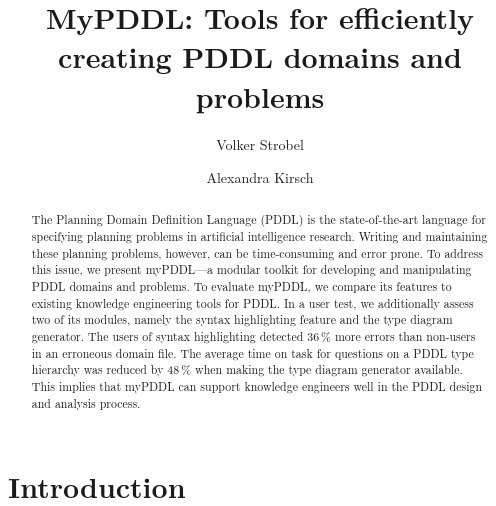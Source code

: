 \documentclass[runningheads]{llncs}
\begin{document}
%
\title{MyPDDL: Tools for efficiently creating PDDL domains and
  problems}
%
%
\author{Volker Strobel \and
Alexandra Kirsch}
%
%
%
\maketitle              %
%
\begin{abstract}
  The Planning Domain Definition Language (PDDL) is the
  state-of-the-art language for specifying planning problems in
  artificial intelligence research. Writing and maintaining these
  planning problems, however, can be time-consuming and error
  prone. To address this issue, we present myPDDL---a modular toolkit
  for developing and manipulating PDDL domains and problems. To
  evaluate myPDDL, we compare its features to existing knowledge
  engineering tools for PDDL. In a user test, we additionally assess
  two of its modules, namely the syntax highlighting feature and the
  type diagram generator. The users of syntax highlighting detected
  36\,\% more errors than non-users in an erroneous domain file. The
  average time on task for questions on a PDDL type hierarchy was
  reduced by 48\,\% when making the type diagram generator
  available. This implies that myPDDL can support knowledge engineers
  well in the PDDL design and analysis process.
  
\end{abstract}

\section{Introduction}
\label{sec:introduction}
\end{document}
